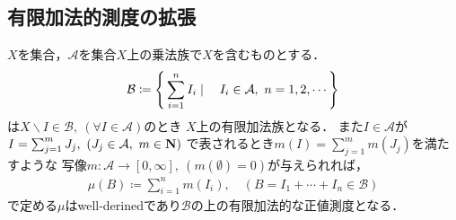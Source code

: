 \subsection{有限加法的測度の拡張}
		\begin{screen}
			\begin{thm}[有限加法的な正値測度空間の生成]\label{thm:forming_finitely_additive_class}
				$X$を集合，$\mathcal{A}$を集合$X$上の乗法族で$X$を含むものとする．
				\begin{align}
					\mathcal{B} \coloneqq \left\{\, \sum_{i=1}^n I_i \mid \quad I_i \in \mathcal{A},\ n=1,2,\cdots\, \right\}
				\end{align}
				は$X\backslash I \in \mathcal{B},\ (\forall I \in \mathcal{A})$のとき
				$X$上の有限加法族となる．
				また$I \in \mathcal{A}$が$I = \sum_{j=1}^m J_j,\ (J_j \in \mathcal{A},\ m \in \mathbf{N})$
				で表されるとき$m(I) = \sum_{j=1}^m m(J_j)$を満たすような
				写像$m:\mathcal{A} \longrightarrow [0,\infty],\ (m(\emptyset)=0)$が与えられれば，
				\begin{align}
					\mu(B) \coloneqq \sum_{i=1}^n m(I_i),
					\quad (B=I_1 + \cdots + I_n \in \mathcal{B})
				\end{align}
				で定める$\mu$はwell-derinedであり$\mathcal{B}$の上の有限加法的な正値測度となる．
			\end{thm}
		\end{screen}
		
